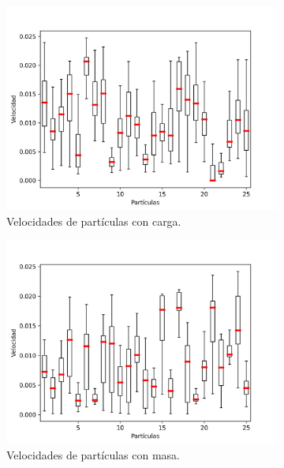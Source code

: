 \documentclass{report}
\begin{document}
\begin{figure}[h]
\centering
    \begin{subfigure}[b]{0.49\textwidth}
         \centering
         \includegraphics[width=\textwidth]{Images/p9pc.png}
         \caption{Velocidades de part\'iculas con carga.}
         \label{fig:carga}
    \end{subfigure}
    \begin{subfigure}[b]{0.49\textwidth}
         \centering
         \includegraphics[width=\textwidth]{Images/p9pm.png}
         \caption{Velocidades de part\'iculas con masa.}
         \label{fig:masa}
    \end{subfigure}
    \begin{subfigure}[b]{0.49\textwidth}

\end{subfigure}
\end{figure}
\end{document}
